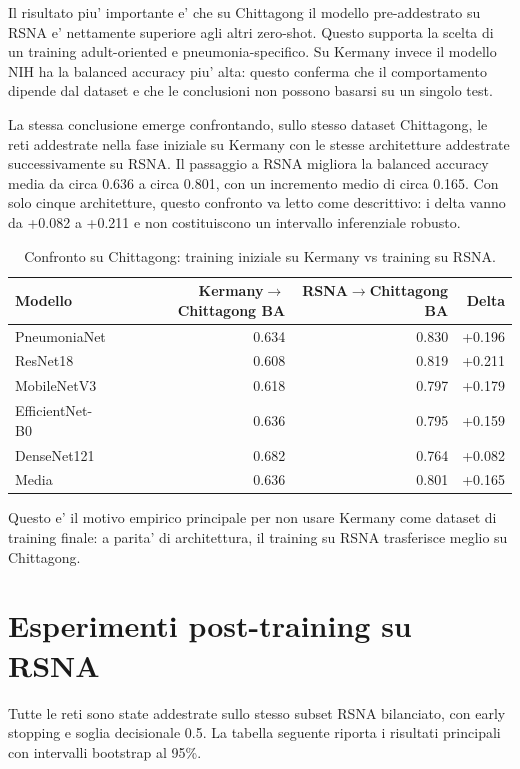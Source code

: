 \documentclass[11pt,a4paper]{article}
\newcommand{\balacc}{balanced accuracy}
\begin{document}
Il risultato piu' importante e' che su Chittagong il modello pre-addestrato su
RSNA e' nettamente superiore agli altri zero-shot. Questo supporta la scelta di
un training adult-oriented e pneumonia-specifico. Su Kermany invece il modello
NIH ha la \balacc{} piu' alta: questo conferma che il comportamento dipende dal
dataset e che le conclusioni non possono basarsi su un singolo test.

La stessa conclusione emerge confrontando, sullo stesso dataset Chittagong, le
reti addestrate nella fase iniziale su Kermany con le stesse architetture
addestrate successivamente su RSNA. Il passaggio a RSNA migliora la \balacc{}
media da circa 0.636 a circa 0.801, con un incremento medio di circa 0.165. Con
solo cinque architetture, questo confronto va letto come descrittivo: i delta
vanno da +0.082 a +0.211 e non costituiscono un intervallo inferenziale robusto.

\begin{table}[H]
\centering
\caption{Confronto su Chittagong: training iniziale su Kermany vs training su RSNA.}
\begin{tabular}{lrrr}
\toprule
Modello & Kermany$\rightarrow$Chittagong BA & RSNA$\rightarrow$Chittagong BA & Delta \\
\midrule
PneumoniaNet & 0.634 & 0.830 & +0.196 \\
ResNet18 & 0.608 & 0.819 & +0.211 \\
MobileNetV3 & 0.618 & 0.797 & +0.179 \\
EfficientNet-B0 & 0.636 & 0.795 & +0.159 \\
DenseNet121 & 0.682 & 0.764 & +0.082 \\
\midrule
Media & 0.636 & 0.801 & +0.165 \\
\bottomrule
\end{tabular}
\end{table}

Questo e' il motivo empirico principale per non usare Kermany come dataset di
training finale: a parita' di architettura, il training su RSNA trasferisce
meglio su Chittagong.

\section{Esperimenti post-training su RSNA}

Tutte le reti sono state addestrate sullo stesso subset RSNA bilanciato, con
early stopping e soglia decisionale 0.5. La tabella seguente riporta i risultati
principali con intervalli bootstrap al 95\%.
\end{document}
